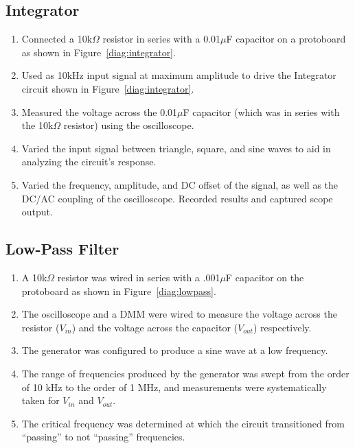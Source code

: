 \documentclass[twocolumn,english]{IEEEtran}
\theoremstyle{plain}
\theoremstyle{plain}
\begin{document}
	\subsection{Integrator}
	\begin{enumerate}
		\item Connected a 10k$\Omega$ resistor in series with a 0.01$\mu$F capacitor on a protoboard as shown in Figure~\ref{diag:integrator}.
		\item Used as 10kHz input signal at maximum amplitude to drive the Integrator circuit shown in Figure~\ref{diag:integrator}.
		\item Measured the voltage across the 0.01$\mu$F capacitor (which was in series with the 10k$\Omega$ resistor) using the oscilloscope.
		\item Varied the input signal between triangle, square, and sine waves to aid in analyzing the circuit's response.
		\item Varied the frequency, amplitude, and DC offset of the signal, as well as the DC/AC coupling of the oscilloscope. Recorded results and captured scope output.
	\end{enumerate}

	\subsection{Low-Pass Filter}
	\begin{enumerate}
		\item A 10k$\Omega$ resistor was wired in series with a .001$\mu$F capacitor on the protoboard as shown in Figure~\ref{diag:lowpass}.
		\item The oscilloscope and a DMM were wired to measure the voltage across the resistor ($V_{in}$) and the voltage across the capacitor ($V_{out}$) respectively.
		\item The generator was configured to produce a sine wave at a low frequency.
		\item The range of frequencies produced by the generator was swept from the order of 10 kHz to the order of 1 MHz, and measurements were systematically taken for $V_{in}$ and $V_{out}$.
		\item The critical frequency was determined at which the circuit transitioned from ``passing'' to not ``passing'' frequencies.
	\end{enumerate}
\end{document}
